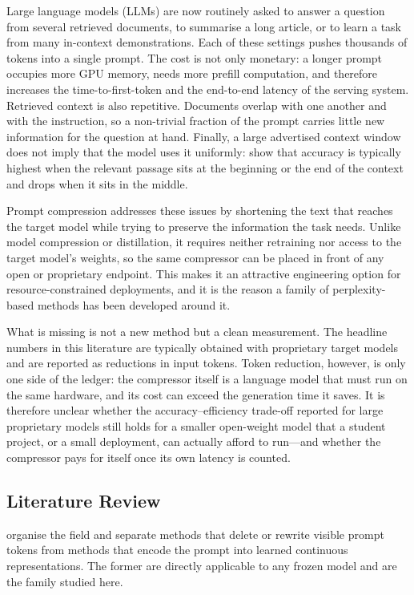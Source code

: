 \documentclass[10pt,a4paper,twocolumn]{article}
\begin{document}
Large language models (LLMs) are now routinely asked to answer a question from
several retrieved documents, to summarise a long article, or to learn a task from
many in-context demonstrations. Each of these settings pushes thousands of tokens
into a single prompt. The cost is not only monetary: a longer prompt occupies more
GPU memory, needs more prefill computation, and therefore increases the
time-to-first-token and the end-to-end latency of the serving system. Retrieved
context is also repetitive. Documents overlap with one another and with the
instruction, so a non-trivial fraction of the prompt carries little new
information for the question at hand. Finally, a large advertised context window
does not imply that the model uses it uniformly: \citet{liu-etal-2024-lost} show
that accuracy is typically highest when the relevant passage sits at the
beginning or the end of the context and drops when it sits in the middle.

Prompt compression addresses these issues by shortening the text that reaches the
target model while trying to preserve the information the task needs. Unlike
model compression or distillation, it requires neither retraining nor access to
the target model's weights, so the same compressor can be placed in front of any
open or proprietary endpoint. This makes it an attractive engineering option for
resource-constrained deployments, and it is the reason a family of
perplexity-based methods has been developed around it.

What is missing is not a new method but a clean measurement. The headline numbers
in this literature are typically obtained with proprietary target models and are
reported as reductions in input tokens. Token reduction, however, is only one side
of the ledger: the compressor itself is a language model that must run on the same
hardware, and its cost can exceed the generation time it saves. It is therefore
unclear whether the accuracy--efficiency trade-off reported for large proprietary
models still holds for a smaller open-weight model that a student project, or a
small deployment, can actually afford to run---and whether the compressor pays for
itself once its own latency is counted.

\subsection{Literature Review}

\citet{li-etal-2025-prompt-survey} organise the field and separate methods that
delete or rewrite visible prompt tokens from methods that encode the prompt into
learned continuous representations. The former are directly applicable to any
frozen model and are the family studied here.
\end{document}
